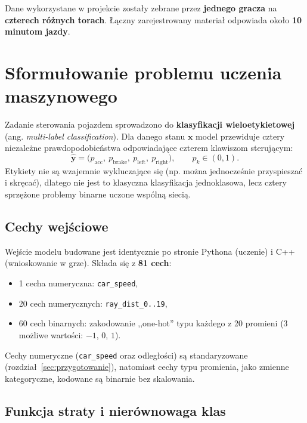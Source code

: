 \documentclass[11pt,a4paper]{article}
\begin{document}
Dane wykorzystane w projekcie zostały zebrane przez \textbf{jednego gracza} na
\textbf{czterech różnych torach}. Łączny zarejestrowany materiał odpowiada około
\textbf{10 minutom jazdy}.

\section{Sformułowanie problemu uczenia maszynowego}
\label{sec:problem}

Zadanie sterowania pojazdem sprowadzono do \textbf{klasyfikacji wieloetykietowej}
(ang. \emph{multi-label classification}). Dla danego stanu $\mathbf{x}$ model
przewiduje cztery niezależne prawdopodobieństwa odpowiadające czterem klawiszom
sterującym:
\[
\hat{\mathbf{y}} = \big(p_\text{acc},\ p_\text{brake},\ p_\text{left},\ p_\text{right}\big),
\qquad p_k \in (0,1).
\]
Etykiety nie są wzajemnie wykluczające się (np. można jednocześnie przyspieszać i
skręcać), dlatego nie jest to klasyczna klasyfikacja jednoklasowa, lecz cztery
sprzężone problemy binarne uczone wspólną siecią.

\subsection{Cechy wejściowe}

Wejście modelu budowane jest identycznie po stronie Pythona (uczenie) i C++
(wnioskowanie w grze). Składa się z \textbf{81 cech}:
\begin{itemize}[noitemsep]
  \item 1 cecha numeryczna: \texttt{car\_speed},
  \item 20 cech numerycznych: \texttt{ray\_dist\_0..19},
  \item 60 cech binarnych: zakodowanie ,,one-hot'' typu każdego z 20 promieni
        (3 możliwe wartości: $-1$, $0$, $1$).
\end{itemize}
Cechy numeryczne (\texttt{car\_speed} oraz odległości) są standaryzowane
(rozdział~\ref{sec:przygotowanie}), natomiast cechy typu promienia, jako zmienne
kategoryczne, kodowane są binarnie bez skalowania.

\subsection{Funkcja straty i nierównowaga klas}
\label{sec:strata}
\end{document}
